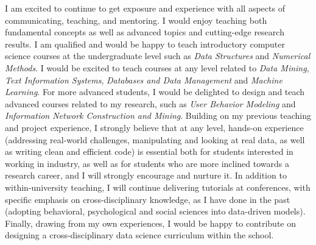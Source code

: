 \documentclass[10.5pt]{article}
\begin{document}
\vskip 0.06in
\vskip 0.02in

I am excited to continue to get exposure and experience with all aspects of communicating, teaching, and mentoring. I would enjoy teaching both fundamental concepts as well as advanced topics and cutting-edge research results. I am qualified and would be happy to teach introductory computer science courses at the undergraduate level such as \emph{Data Structures} and \emph{Numerical Methods}. I would be excited to teach courses at any level related to \emph{Data Mining}, \emph{Text Information Systems}, \emph{Databases and Data Management} and \emph{Machine Learning}. For more advanced students, I would be delighted to design and teach advanced courses related to my research, such as \emph{User Behavior Modeling} and \emph{Information Network Construction and Mining}. Building on my previous teaching and project experience, I strongly believe that at any level, hands-on experience (addressing real-world challenges, manipulating and looking at real data, as well as writing clean and efficient code) is essential both for students interested in working in industry, as well as for students who are more inclined towards a research career, and I will strongly encourage and nurture it. In addition to within-university teaching, I will continue delivering tutorials at conferences, with specific emphasis on cross-disciplinary knowledge, as I have done in the past (adopting behavioral, psychological and social sciences into data-driven models). Finally, drawing from my own experiences, I would be happy to contribute on designing a cross-disciplinary data science curriculum within the school.

\vspace{-0.2in}


\end{document}
